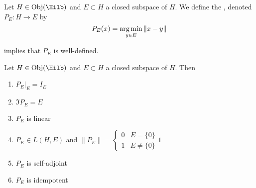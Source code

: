 \documentclass{book}
\begin{document}
\begin{defn}
	Let $H \in \Obj(\Hilb)$ and $E \subset H$ a closed subspace of $H$. We define the , denoted $P_E: H \rightarrow E$ by 
	$$P_E(x) = \operatorname*{arg\,min}\limits_{y \in E} \| x - y\|$$
\end{defn}

\begin{note}
	 implies that $P_E$ is well-defined.
\end{note}

\begin{ex}
	Let $H \in \Obj(\Hilb)$ and $E \subset H$ a closed subspace of $H$. Then 
	\begin{enumerate}
		\item $P_E|_E = I_E$
		\item $\Im P_E = E$
		\item $P_E$ is linear
		\item $P_E \in L(H, E)$ and $\|P_E\| =  
		\begin{cases}
			0 & E = \{0\} \\
			1 & E \neq \{0\}
		\end{cases}1$
		\item $P_E$ is self-adjoint
		\item $P_E$ is idempotent
	\end{enumerate}
\end{ex}
\end{document}
